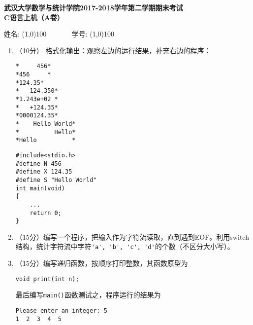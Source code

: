 \documentclass[8pt]{article}
\newlength{\ld}
\begin{document}
\begin{CJK}{UTF8}{gkai}
\begin{center}
{\Large \bf  武汉大学数学与统计学院2017-2018学年第二学期期末考试\\[0.1in]
  C语言上机（A卷）} \vspace{0.1in}

姓名: \line(1,0){100} ~~~~~~ 学号: \line(1,0){100}

\end{center}


\begin{enumerate} %
\item （10分） 格式化输出：观察左边的运行结果，补充右边的程序：

\begin{minipage}{0.45\textwidth}
\begin{lstlisting}[showspaces=true]
*     456*
*456     *
*124.35*
*   124.350*
*1.243e+02 *
*   +124.35*
*0000124.35*
*    Hello World*
*          Hello*
*Hello          *
\end{lstlisting}
\end{minipage}\hfill
\begin{minipage}{0.45\linewidth}
\begin{lstlisting} 
#include<stdio.h>
#define N 456
#define X 124.35
#define S "Hello World"
int main(void)
{  
	...
   	return 0;
}
\end{lstlisting}
\end{minipage}

\item （15分）编写一个程序，把输入作为字符流读取，直到遇到EOF。利用switch结构，统计字符流中字符\lstinline|'a', 'b', 'c', 'd'|的个数（不区分大小写）。

\item （15分）编写递归函数，按顺序打印整数，其函数原型为
\begin{lstlisting}
void print(int n);
\end{lstlisting}
最后编写\lstinline|main()|函数测试之，程序运行的结果为
\begin{lstlisting}
Please enter an integer: 5
1  2  3  4  5  
\end{lstlisting}





\end{enumerate}
\end{CJK}
\end{document}
